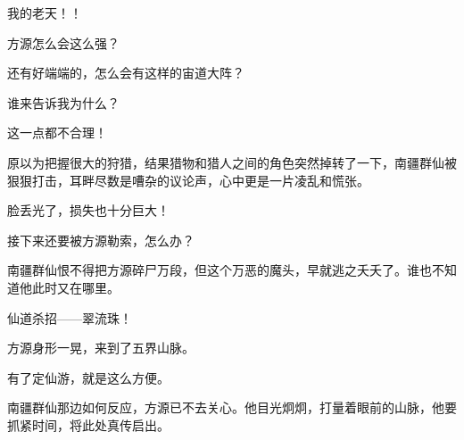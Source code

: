 \begin{this_body}
我的老天！！

方源怎么会这么强？

还有好端端的，怎么会有这样的宙道大阵？

谁来告诉我为什么？

这一点都不合理！

原以为把握很大的狩猎，结果猎物和猎人之间的角色突然掉转了一下，南疆群仙被狠狠打击，耳畔尽数是嘈杂的议论声，心中更是一片凌乱和慌张。

脸丢光了，损失也十分巨大！

接下来还要被方源勒索，怎么办？

南疆群仙恨不得把方源碎尸万段，但这个万恶的魔头，早就逃之夭夭了。谁也不知道他此时又在哪里。

仙道杀招——翠流珠！

方源身形一晃，来到了五界山脉。

有了定仙游，就是这么方便。

南疆群仙那边如何反应，方源已不去关心。他目光炯炯，打量着眼前的山脉，他要抓紧时间，将此处真传启出。

\end{this_body}

